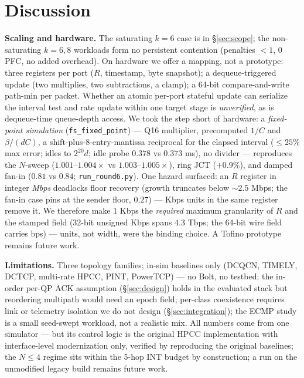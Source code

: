 \documentclass[conference]{IEEEtran}
\renewcommand{\paragraph}[1]{\par\smallskip\noindent\textbf{#1}\hspace{0.5em}\ignorespaces}
\begin{document}
\section{Discussion}
\label{sec:discussion}

\paragraph{Scaling and hardware.} The saturating $k{=}6$ case is in \S\ref{sec:scope}; the non-saturating $k = 6, 8$
workloads form no persistent contention (penalties ${<}1$, 0 PFC, no added overhead). On
hardware we offer a mapping, not a prototype: three registers per port ($R$, timestamp,
byte snapshot); a dequeue-triggered update (two multiplies, two subtractions, a clamp); a
64-bit compare-and-write path-min per packet.
Whether an atomic per-port stateful update can serialize the interval test and rate update
within one target stage is \emph{unverified}, as is dequeue-time queue-depth access. We took the step short of hardware: a
\emph{fixed-point simulation} (\texttt{fs\_fixed\_point}) --- Q16 multiplier, precomputed
$1/C$ and $\beta/(dC)$, a shift-plus-8-entry-mantissa reciprocal for the elapsed interval
($\le 25\%$ max error; idles to $2^{20} d$; idle probe $0.378$ vs $0.373$ ms), no
divider
--- reproduces the $N$-sweep ($1.001$--$1.004\times$ vs $1.003$--$1.005\times$), ring JCT
($+0.9\%$), and damped fan-in ($0.81$ vs $0.84$; \texttt{run\_round6.py}). One hazard surfaced: an $R$ register in integer
\emph{Mbps} deadlocks floor recovery (growth truncates below ${\sim}2.5$ Mbps; the fan-in
case pins at the sender floor, $0.27$) --- Kbps units in the same register remove it. We therefore make 1 Kbps the \emph{required} maximum
granularity of $R$ and the stamped field (32-bit unsigned Kbps spans 4.3 Tbps; the 64-bit
wire field carries bps) --- units, not width, were the binding choice. A Tofino prototype
remains future work.

\paragraph{Limitations.} Three topology families; in-sim baselines only (DCQCN, TIMELY, DCTCP,
multi-rate HPCC, PINT, PowerTCP) --- no Bolt, no testbed; the in-order per-QP ACK assumption
(\S\ref{sec:design}) holds in the evaluated stack but reordering multipath would need an
epoch field; per-class
coexistence requires link or telemetry isolation we do not design
(\S\ref{sec:integration}); the ECMP study is a small seed-swept workload, not a realistic
mix.
All numbers come from one simulator --- but its control logic is the original HPCC
implementation with interface-level modernization only, verified by reproducing the original
baselines; the $N \le 4$ regime sits within the 5-hop INT budget by construction; a run on
the unmodified legacy build remains future work.
\end{document}
